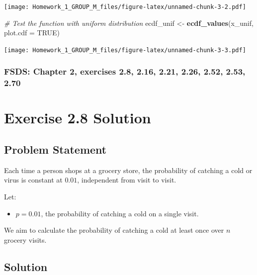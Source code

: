 \documentclass[
]{article}
\newenvironment{Shaded}{\begin{snugshade}}{\end{snugshade}}
\newcommand{\AttributeTok}[1]{\textcolor[rgb]{0.13,0.29,0.53}{#1}}
\newcommand{\CommentTok}[1]{\textcolor[rgb]{0.56,0.35,0.01}{\textit{#1}}}
\newcommand{\ConstantTok}[1]{\textcolor[rgb]{0.56,0.35,0.01}{#1}}
\newcommand{\FunctionTok}[1]{\textcolor[rgb]{0.13,0.29,0.53}{\textbf{#1}}}
\newcommand{\NormalTok}[1]{#1}
\newcommand{\OtherTok}[1]{\textcolor[rgb]{0.56,0.35,0.01}{#1}}
\providecommand{\tightlist}{%
  \setlength{\itemsep}{0pt}\setlength{\parskip}{0pt}}
\begin{document}
\texttt{[image: Homework\_1\_GROUP\_M\_files/figure-latex/unnamed-chunk-3-2.pdf]}

\begin{Shaded}
\begin{Highlighting}[]
\CommentTok{\# Test the function with uniform distribution}
\NormalTok{ecdf\_unif }\OtherTok{\textless{}{-}} \FunctionTok{ecdf\_values}\NormalTok{(x\_unif, }\AttributeTok{plot.cdf =} \ConstantTok{TRUE}\NormalTok{)}
\end{Highlighting}
\end{Shaded}

\texttt{[image: Homework\_1\_GROUP\_M\_files/figure-latex/unnamed-chunk-3-3.pdf]}

\hypertarget{fsds-chapter-2-exercises-2.8-2.16-2.21-2.26-2.52-2.53-2.70}{%
\subsubsection{FSDS: Chapter 2, exercises 2.8, 2.16, 2.21, 2.26, 2.52,
2.53,
2.70}\label{fsds-chapter-2-exercises-2.8-2.16-2.21-2.26-2.52-2.53-2.70}}

\hypertarget{exercise-2.8-solution}{%
\section{Exercise 2.8 Solution}\label{exercise-2.8-solution}}

\hypertarget{problem-statement}{%
\subsection{Problem Statement}\label{problem-statement}}

Each time a person shops at a grocery store, the probability of catching
a cold or virus is constant at \(0.01\), independent from visit to
visit.

Let:

\begin{itemize}
\tightlist
\item
  \(p = 0.01\), the probability of catching a cold on a single visit.
\end{itemize}

We aim to calculate the probability of catching a cold at least once
over \(n\) grocery visits.

\hypertarget{solution}{%
\subsection{Solution}\label{solution}}
\end{document}
